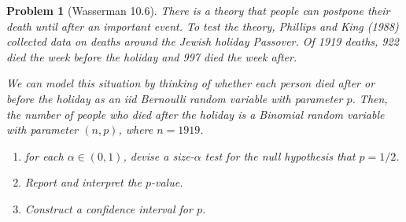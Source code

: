 \documentclass{article}
\newtheorem{problem}{Problem}
\begin{document}
\begin{problem}[Wasserman 10.6]
There is a theory that people can postpone their death until after an  important event. To test the theory, Phillips and King (1988) collected  data on deaths around the Jewish holiday Passover. 
Of 1919 deaths, 922  died the week before the holiday and 997 died the week after. 

    We can model this situation by thinking of whether each person died after or before the holiday as an iid Bernoulli random variable with parameter $p$.
    Then, the number of people who died after the holiday is a Binomial random variable with parameter $(n,p)$, where $n=1919$.

    \begin{enumerate}[label=(\alph*),topsep=0pt]
        \item for each $\alpha\in(0,1)$, devise a size-$\alpha$ test for the null hypothesis that $p = 1/2$. 
        \item Report and  interpret the $p$-value. 
        \item Construct a confidence interval for $p$.
    \end{enumerate}
\end{problem}
\end{document}
